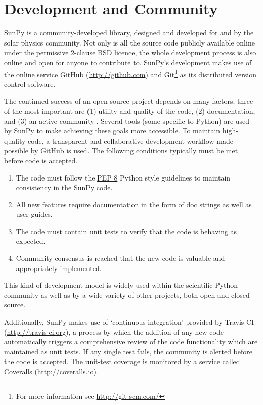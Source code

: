 \section{Development and Community}\label{sec:dev}
SunPy is a community-developed library, designed and developed for and by 
the solar physics community. Not only is all the source code publicly available 
online under the permissive 2-clause BSD licence, the whole 
development process is also online and open for anyone to contribute to.
SunPy's development makes use of the online service 
GitHub (\url{http://github.com}) and Git\footnote{For more information see \url{http://git-scm.com/}}
as its distributed version control software. 

The continued success of an open-source project depends on many factors;
three of the most important are (1) utility and quality of the code, (2) documentation, and (3) an
active community \citep{bangerth2013}. Several tools (some specific to Python) are used by
SunPy to make achieving these goals more accessible. To maintain high-quality code, a 
transparent and collaborative development workflow made possible by GitHub is used.
The following conditions typically must be met before code is accepted.
\begin{enumerate}
	\item  The code must follow the
	\href{http://www.python.org/dev/peps/pep-0008/}{PEP 8} Python style 
	guidelines to maintain consistency in the SunPy code.
	
	\item All new features require documentation in the form of doc strings as well as user
	guides. 
	
	\item The code must contain unit tests to verify that the code is behaving 
	as expected.

        \item Community consensus is reached that the new code is valuable and appropriately implemented.
\end{enumerate}
This kind of development model is widely used within the scientific Python 
community as well as by a wide variety of other projects, both open and closed 
source.

Additionally, SunPy makes use of `continuous integration' provided by Travis CI (\url{http://travis-ci.org}), a process by which the addition of any new code 
automatically triggers a comprehensive review of the code functionality which are maintained as unit tests.
 If any single test
fails, the community is alerted before the code is accepted. The unit-test coverage is monitored by
a service called Coveralls (\url{http://coveralls.io}).

